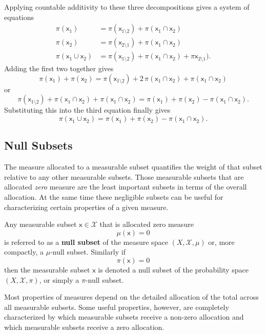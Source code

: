 \documentclass[
  letterpaper,
  DIV=11,
  numbers=noendperiod]{scrartcl}
\begin{document}
Applying countable additivity to these three decompositions gives a
system of equations \begin{align*}
\pi(\mathsf{x}_{1}) &=
\pi(\mathsf{x}_{1 \setminus 2}) + \pi(\mathsf{x}_{1} \cap \mathsf{x}_{2})
\\
\pi(\mathsf{x}_{2}) &=
\pi(\mathsf{x}_{2 \setminus 1}) + \pi(\mathsf{x}_{1} \cap \mathsf{x}_{2})
\\
\pi(\mathsf{x}_{1} \cup \mathsf{x}_{2}) &=
\pi(\mathsf{x}_{1 \setminus 2})
+ \pi(\mathsf{x}_{1} \cap \mathsf{x}_{2})
+ \pi \mathsf{x}_{2 \setminus 1}).
\end{align*} Adding the first two together gives \[
\pi(\mathsf{x}_{1}) + \pi(\mathsf{x}_{2})
=
\pi(\mathsf{x}_{1 \setminus 2})
+ 2 \, \pi(\mathsf{x}_{1} \cap \mathsf{x}_{2})
+ \pi(\mathsf{x}_{1} \cap \mathsf{x}_{2})
\] or \[
\pi(\mathsf{x}_{1 \setminus 2})
+ \pi(\mathsf{x}_{1} \cap \mathsf{x}_{2})
+ \pi(\mathsf{x}_{1} \cap \mathsf{x}_{2})
=
\pi(\mathsf{x}_{1}) + \pi(\mathsf{x}_{2})
- \pi(\mathsf{x}_{1} \cap \mathsf{x}_{2}).
\] Substituting this into the third equation finally gives \[
\pi(\mathsf{x}_{1} \cup \mathsf{x}_{2})
=
\pi(\mathsf{x}_{1}) + \pi(\mathsf{x}_{2})
- \pi(\mathsf{x}_{1} \cap \mathsf{x}_{2}).
\]

\hypertarget{null-subsets}{%
\subsection{Null Subsets}\label{null-subsets}}

The measure allocated to a measurable subset quantifies the weight of
that subset relative to any other measurable subsets. Those measurable
subsets that are allocated \emph{zero} measure are the least important
subsets in terms of the overall allocation. At the same time these
negligible subsets can be useful for characterizing certain properties
of a given measure.

Any measurable subset \(\mathsf{x} \in \mathcal{X}\) that is allocated
zero measure \[
\mu(\mathsf{x}) = 0
\] is referred to as a \textbf{null subset} of the measure space
\((X, \mathcal{X}, \mu)\) or, more compactly, a \(\mu\)-null subset.
Similarly if \[
\pi(\mathsf{x}) = 0
\] then the measurable subset \(\mathsf{x}\) is denoted a null subset of
the probability space \((X, \mathcal{X}, \pi)\), or simply a
\(\pi\)-null subset.

Most properties of measures depend on the detailed allocation of the
total across all measurable subsets. Some useful properties, however,
are completely characterized by which measurable subsets receive a
non-zero allocation and which measurable subsets receive a zero
allocation.
\end{document}
